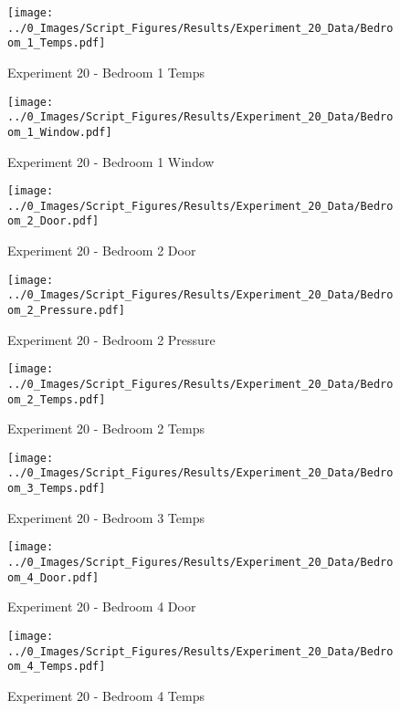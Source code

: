 	\begin{figure}[H]
		\centering
		\texttt{[image: ../0\_Images/Script\_Figures/Results/Experiment\_20\_Data/Bedroom\_1\_Temps.pdf]}
		\caption[]{Experiment 20 - Bedroom 1 Temps}
	\end{figure}
 
	\clearpage

	\begin{figure}[H]
		\centering
		\texttt{[image: ../0\_Images/Script\_Figures/Results/Experiment\_20\_Data/Bedroom\_1\_Window.pdf]}
		\caption[]{Experiment 20 - Bedroom 1 Window}
	\end{figure}
 

	\begin{figure}[H]
		\centering
		\texttt{[image: ../0\_Images/Script\_Figures/Results/Experiment\_20\_Data/Bedroom\_2\_Door.pdf]}
		\caption[]{Experiment 20 - Bedroom 2 Door}
	\end{figure}
 
	\clearpage

	\begin{figure}[H]
		\centering
		\texttt{[image: ../0\_Images/Script\_Figures/Results/Experiment\_20\_Data/Bedroom\_2\_Pressure.pdf]}
		\caption[]{Experiment 20 - Bedroom 2 Pressure}
	\end{figure}
 

	\begin{figure}[H]
		\centering
		\texttt{[image: ../0\_Images/Script\_Figures/Results/Experiment\_20\_Data/Bedroom\_2\_Temps.pdf]}
		\caption[]{Experiment 20 - Bedroom 2 Temps}
	\end{figure}
 
	\clearpage

	\begin{figure}[H]
		\centering
		\texttt{[image: ../0\_Images/Script\_Figures/Results/Experiment\_20\_Data/Bedroom\_3\_Temps.pdf]}
		\caption[]{Experiment 20 - Bedroom 3 Temps}
	\end{figure}
 

	\begin{figure}[H]
		\centering
		\texttt{[image: ../0\_Images/Script\_Figures/Results/Experiment\_20\_Data/Bedroom\_4\_Door.pdf]}
		\caption[]{Experiment 20 - Bedroom 4 Door}
	\end{figure}
 
	\clearpage

	\begin{figure}[H]
		\centering
		\texttt{[image: ../0\_Images/Script\_Figures/Results/Experiment\_20\_Data/Bedroom\_4\_Temps.pdf]}
		\caption[]{Experiment 20 - Bedroom 4 Temps}
	\end{figure}
 

